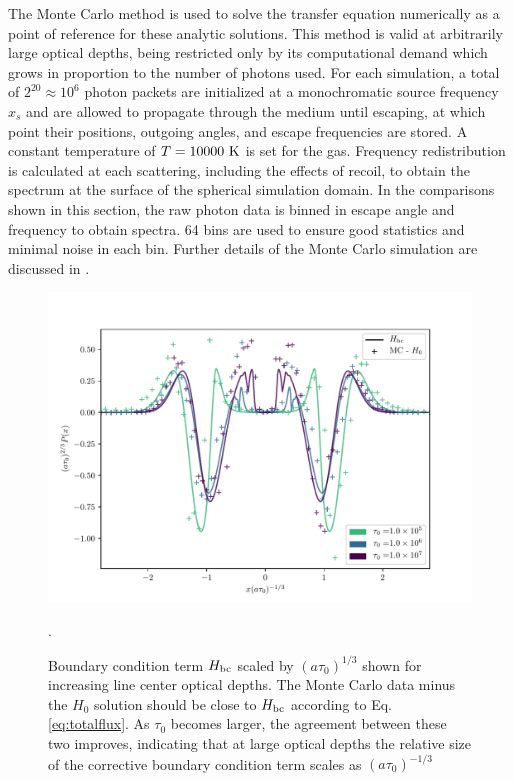 \documentclass{aastex63}
\begin{document}

The Monte Carlo method is used to solve the transfer equation numerically as a point of reference for these analytic solutions. This method is valid at arbitrarily large optical depths, being restricted only by its computational demand which grows in proportion to the number of photons used. For each simulation, a total of $2^{20} \approx 10^6$ photon packets are initialized at a monochromatic source frequency $x_s$ and are allowed to propagate through the medium until escaping, at which point their positions, outgoing angles, and escape frequencies are stored. A constant temperature of $T=10000\ \rm K$ is set for the gas. Frequency redistribution is calculated at each scattering, including the effects of recoil, to obtain the spectrum at the surface of the spherical simulation domain. In the comparisons shown in this section, the raw photon data is binned in escape angle and frequency to obtain spectra. 64 bins are used to ensure good statistics and minimal noise in each bin. Further details of the Monte Carlo simulation are discussed in \cite{2017ApJ...851..150H}.

\ifx
\begin{figure}
    \centering
    \includegraphics{taubc.pdf}
    \caption{Boundary condition term $H_{\rm bc}$ scaled by $(a\tau_0)^{1/3}$ shown for increasing line center optical depths. The Monte Carlo data minus the $H_0$ solution should be close to $H_{\rm bc}$ according to Eq. \ref{eq:totalflux}. As $\tau_0$ becomes larger, the agreement between these two improves, indicating that at large optical depths the relative size of the corrective boundary condition term scales as $(a\tau_0)^{-1/3}$}.
    \label{fig:taubc}
\end{figure}
\fi
\end{document}
